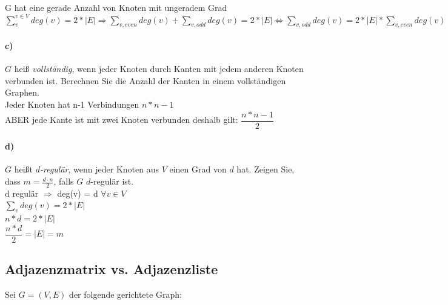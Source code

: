 \documentclass[paper=a4, fontsize=11pt]{scrartcl}
\numberwithin{equation}{section}
\numberwithin{figure}{section}
\numberwithin{table}{section}
\begin{document}
G hat eine gerade Anzahl von Knoten mit ungeradem Grad \\
$\sum^{v \in V}_{v} deg(v) = 2*|E| \Rightarrow \sum_{v,even} deg(v) + \sum_{v,odd} deg(v)=2*|E| \Leftrightarrow \sum_{v,odd} deg(v) = 2*|E| * \sum_{v,even} deg(v)$

\paragraph{c)}
$G$ heiß \emph{vollständig}, wenn jeder Knoten durch Kanten mit jedem anderen Knoten
verbunden ist. Berechnen Sie die Anzahl der Kanten in einem vollständigen Graphen. \\

Jeder Knoten hat n-1 Verbindungen $n*n-1$ \\
ABER jede Kante ist mit zwei Knoten verbunden deshalb gilt: $\dfrac{n*n-1}{2}$

\paragraph{d)}
$G$ heißt \emph{$d$-regulär}, wenn jeder Knoten aus $V$ einen Grad von $d$ hat.
Zeigen Sie, dass $m=\tfrac{d\cdot n}2$, falls $G$ $d$-regulär ist. \\

d regulär $\Rightarrow$ deg(v) = d $\forall v \in V$ \\
$\sum_{v} deg(v)= 2* |E|$ \\
$n*d= 2*|E|$ \\
$\dfrac{n*d}{2}=|E|=m$

\subsection{Adjazenzmatrix vs. Adjazenzliste}
Sei $G=(V,E)$ der folgende gerichtete Graph:
\end{document}
